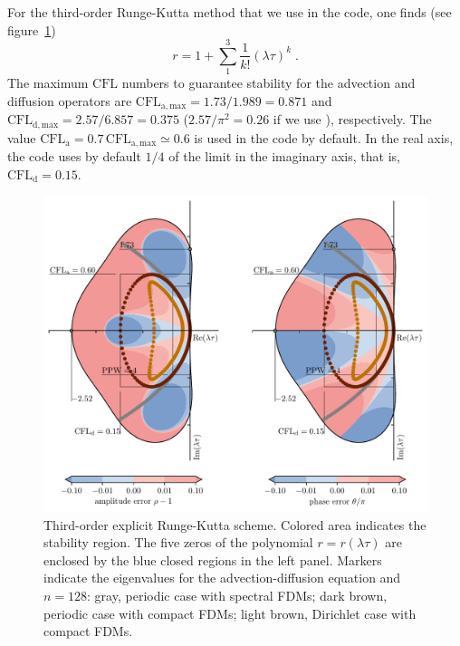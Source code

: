 {For the third-order Runge-Kutta method that we use in the code, one finds (see figure~\ref{fig:rkm3})
\begin{equation}
  r=1+\sum_1^3\frac{1}{k!}(\lambda \tau)^k \;.
\end{equation}
The maximum $\mathrm{CFL}$ numbers to guarantee stability for the advection and diffusion operators are $\mathrm{CFL}_\mathrm{a,max} = 1.73/1.989=0.871$ and $\mathrm{CFL}_\mathrm{d,max} = 2.57/6.857=0.375$ ($2.57/\pi^2=0.26$ if we use \cite{Lamballais:2011}), respectively. The value $\mathrm{CFL}_\mathrm{a}=0.7\,\mathrm{CFL}_\mathrm{a,max}\simeq 0.6$ is used in the code by default. In the real axis, the code uses by default $1/4$ of the limit in the imaginary axis, that is, $\textrm{CFL}_\mathrm{d}=0.15$.

\begin{figure}[!ht]
  \centering
  \includegraphics[clip,height=0.7\textwidth]{figs/rkm3}
  \caption{Third-order explicit Runge-Kutta scheme. Colored area indicates the stability region. The five zeros of the polynomial $r=r(\lambda\tau)$ are enclosed by the blue closed regions in the left panel. Markers indicate the eigenvalues for the advection-diffusion equation and $n=128$: gray, periodic case with spectral FDMs; dark brown, periodic case with compact FDMs; light brown, Dirichlet case with compact FDMs.}
  \label{fig:rkm3}
\end{figure}

}
